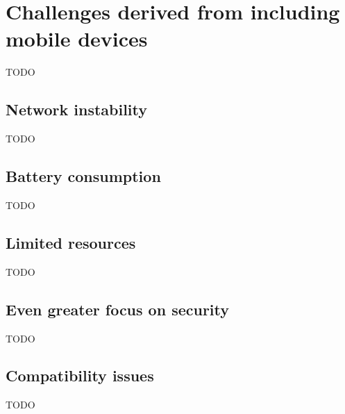 \section{Challenges derived from including mobile devices}
TODO

\subsection{Network instability}
TODO

\subsection{Battery consumption}
TODO 




\subsection{Limited resources}
TODO

\subsection{Even greater focus on security}
TODO

\subsection{Compatibility issues}
TODO
